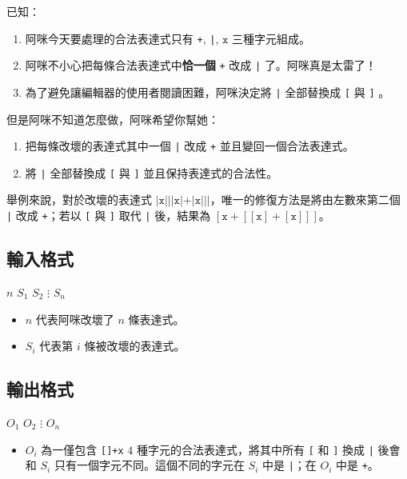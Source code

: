已知：

\begin{enumerate}
\def\labelenumi{\arabic{enumi}.}
\tightlist
\item
  阿咪今天要處理的合法表達式只有 \texttt{+}, \texttt{|}, \(\mathtt{x}\)
  三種字元組成。
\item
  阿咪不小心把每條合法表達式中\textbf{恰一個} \texttt{+} 改成 \texttt{|}
  了。阿咪真是太雷了！
\item
  為了避免讓編輯器的使用者閱讀困難，阿咪決定將 \texttt{|} 全部替換成
  \texttt{[} 與 \texttt{]} 。
\end{enumerate}

但是阿咪不知道怎麼做，阿咪希望你幫她：

\begin{enumerate}
\def\labelenumi{\arabic{enumi}.}
\tightlist
\item
  把每條改壞的表達式其中一個 \texttt{|} 改成 \texttt{+}
  並且變回一個合法表達式。
\item
  將 \texttt{|} 全部替換成 \texttt{[} 與 \texttt{]}
  並且保持表達式的合法性。
\end{enumerate}

舉例來說，對於改壞的表達式
\(\mathtt{|x|||x|+|x|||}\)，唯一的修復方法是將由左數來第二個 \texttt{|}
改成 \texttt{+}；若以 \texttt{[} 與 \texttt{]} 取代 \texttt{|}
後，結果為 \(\mathtt{[x+[[x]+[x]]]}\)。

\subsection{輸入格式}

\begin{format}
\f{
$n$
$S_1$
$S_2$
$\vdots$
$S_n$
}
\end{format}

\begin{itemize}
\tightlist
\item
  \(n\) 代表阿咪改壞了 \(n\) 條表達式。
\item
  \(S_i\) 代表第 \(i\) 條被改壞的表達式。
\end{itemize}

\subsection{輸出格式}

\begin{format}
\f{
$O_1$
$O_2$
$\vdots$
$O_n$
}
\end{format}

\begin{itemize}
\tightlist
\item
  \(O_i\) 為一僅包含 \texttt{[]+x} \(4\) 種字元的合法表達式，將其中所有
  \texttt{[} 和 \texttt{]} 換成 \texttt{|} 後會和 \(S_i\)
  只有一個字元不同。這個不同的字元在 \(S_i\) 中是 \texttt{|}；在 \(O_i\)
  中是 \texttt{+}。
\end{itemize}

